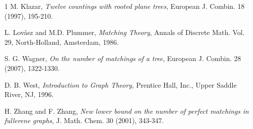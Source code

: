 \documentclass[11pt]{article}
\begin{document}
\begin{thebibliography}{1}
      M. Klazar, {\it Twelve countings with rooted plane trees}, European J. Combin. 18 (1997), 195-210.

      L. Lov\'asz and M.D. Plummer, {\it Matching Theory}, Annals of Discrete Math. Vol. 29, North-Holland, Amsterdam, 1986.

      S. G. Wagner, {\it On the number of matchings of a tree}, European J. Combin. 28 (2007), 1322-1330.

      D. B. West, {\it Introduction to Graph Theory}, Prentice Hall, Inc., Upper Saddle River, NJ, 1996.

      H. Zhang and F. Zhang, {\it New lower bound on the number of perfect matchings in fullerene
graphs}, J. Math. Chem. 30 (2001), 343-347.

\end{thebibliography}
\end{document}
